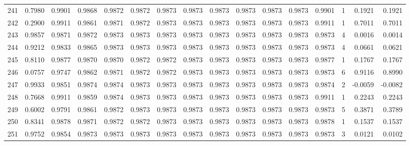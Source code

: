 \begin{tabular}{lrrrrrrrrrrrrrrr}
241 &      0.7980 &  0.9901 &  0.9868 &  0.9872 &  0.9872 &  0.9873 &  0.9873 &  0.9873 &  0.9873 &  0.9873 &   0.9873 &     0.9901 &      1 &                    0.1921 &                     0.1921 \\
242 &      0.2900 &  0.9911 &  0.9861 &  0.9871 &  0.9872 &  0.9873 &  0.9873 &  0.9873 &  0.9873 &  0.9873 &   0.9873 &     0.9911 &      1 &                    0.7011 &                     0.7011 \\
243 &      0.9857 &  0.9871 &  0.9872 &  0.9873 &  0.9873 &  0.9873 &  0.9873 &  0.9873 &  0.9873 &  0.9873 &   0.9873 &     0.9873 &      4 &                    0.0016 &                     0.0014 \\
244 &      0.9212 &  0.9833 &  0.9865 &  0.9873 &  0.9873 &  0.9873 &  0.9873 &  0.9873 &  0.9873 &  0.9873 &   0.9873 &     0.9873 &      4 &                    0.0661 &                     0.0621 \\
245 &      0.8110 &  0.9877 &  0.9870 &  0.9870 &  0.9872 &  0.9872 &  0.9873 &  0.9873 &  0.9873 &  0.9873 &   0.9873 &     0.9877 &      1 &                    0.1767 &                     0.1767 \\
246 &      0.0757 &  0.9747 &  0.9862 &  0.9871 &  0.9872 &  0.9872 &  0.9873 &  0.9873 &  0.9873 &  0.9873 &   0.9873 &     0.9873 &      6 &                    0.9116 &                     0.8990 \\
247 &      0.9933 &  0.9851 &  0.9874 &  0.9874 &  0.9873 &  0.9873 &  0.9873 &  0.9873 &  0.9873 &  0.9873 &   0.9873 &     0.9874 &      2 &                   -0.0059 &                    -0.0082 \\
248 &      0.7668 &  0.9911 &  0.9859 &  0.9874 &  0.9873 &  0.9873 &  0.9873 &  0.9873 &  0.9873 &  0.9873 &   0.9873 &     0.9911 &      1 &                    0.2243 &                     0.2243 \\
249 &      0.6002 &  0.9791 &  0.9861 &  0.9872 &  0.9873 &  0.9873 &  0.9873 &  0.9873 &  0.9873 &  0.9873 &   0.9873 &     0.9873 &      5 &                    0.3871 &                     0.3789 \\
250 &      0.8341 &  0.9878 &  0.9871 &  0.9872 &  0.9872 &  0.9873 &  0.9873 &  0.9873 &  0.9873 &  0.9873 &   0.9873 &     0.9878 &      1 &                    0.1537 &                     0.1537 \\
251 &      0.9752 &  0.9854 &  0.9873 &  0.9873 &  0.9873 &  0.9873 &  0.9873 &  0.9873 &  0.9873 &  0.9873 &   0.9873 &     0.9873 &      3 &                    0.0121 &                     0.0102 \\

\end{tabular}
